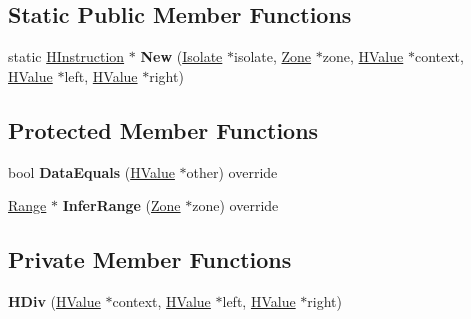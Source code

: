\subsection*{Static Public Member Functions}
\begin{DoxyCompactItemize}
\item 
static \hyperlink{classv8_1_1internal_1_1_h_instruction}{H\+Instruction} $\ast$ {\bfseries New} (\hyperlink{classv8_1_1internal_1_1_isolate}{Isolate} $\ast$isolate, \hyperlink{classv8_1_1internal_1_1_zone}{Zone} $\ast$zone, \hyperlink{classv8_1_1internal_1_1_h_value}{H\+Value} $\ast$context, \hyperlink{classv8_1_1internal_1_1_h_value}{H\+Value} $\ast$left, \hyperlink{classv8_1_1internal_1_1_h_value}{H\+Value} $\ast$right)\hypertarget{classv8_1_1internal_1_1_h_div_a1dc0fef59d47456c815520690758a51f}{}\label{classv8_1_1internal_1_1_h_div_a1dc0fef59d47456c815520690758a51f}

\end{DoxyCompactItemize}
\subsection*{Protected Member Functions}
\begin{DoxyCompactItemize}
\item 
bool {\bfseries Data\+Equals} (\hyperlink{classv8_1_1internal_1_1_h_value}{H\+Value} $\ast$other) override\hypertarget{classv8_1_1internal_1_1_h_div_ad17e28e3a3c164dde05efefb039416fb}{}\label{classv8_1_1internal_1_1_h_div_ad17e28e3a3c164dde05efefb039416fb}

\item 
\hyperlink{classv8_1_1internal_1_1_range}{Range} $\ast$ {\bfseries Infer\+Range} (\hyperlink{classv8_1_1internal_1_1_zone}{Zone} $\ast$zone) override\hypertarget{classv8_1_1internal_1_1_h_div_ab239336d762ad577fe100c05e396fd35}{}\label{classv8_1_1internal_1_1_h_div_ab239336d762ad577fe100c05e396fd35}

\end{DoxyCompactItemize}
\subsection*{Private Member Functions}
\begin{DoxyCompactItemize}
\item 
{\bfseries H\+Div} (\hyperlink{classv8_1_1internal_1_1_h_value}{H\+Value} $\ast$context, \hyperlink{classv8_1_1internal_1_1_h_value}{H\+Value} $\ast$left, \hyperlink{classv8_1_1internal_1_1_h_value}{H\+Value} $\ast$right)\hypertarget{classv8_1_1internal_1_1_h_div_ae4c8d7b77a20a4ba92a69602810d6b0f}{}\label{classv8_1_1internal_1_1_h_div_ae4c8d7b77a20a4ba92a69602810d6b0f}

\end{DoxyCompactItemize}
